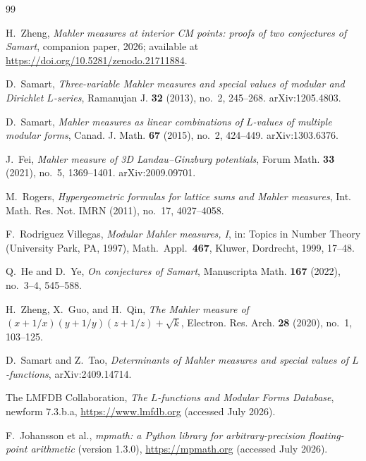 \documentclass[11pt]{article}
\theoremstyle{definition}
\theoremstyle{remark}
\begin{document}
\begin{thebibliography}{99}

H.~Zheng,
\emph{Mahler measures at interior CM points: proofs of two conjectures
of Samart},
companion paper, 2026; available at
\url{https://doi.org/10.5281/zenodo.21711884}.

D.~Samart,
\emph{Three-variable Mahler measures and special values of modular and
Dirichlet $L$-series},
Ramanujan J. \textbf{32} (2013), no.~2, 245--268.
arXiv:1205.4803.

D.~Samart,
\emph{Mahler measures as linear combinations of $L$-values of multiple
modular forms},
Canad. J. Math. \textbf{67} (2015), no.~2, 424--449.
arXiv:1303.6376.

J.~Fei,
\emph{Mahler measure of 3D Landau--Ginzburg potentials},
Forum Math. \textbf{33} (2021), no.~5, 1369--1401.
arXiv:2009.09701.

M.~Rogers,
\emph{Hypergeometric formulas for lattice sums and Mahler measures},
Int. Math. Res. Not. IMRN (2011), no.~17, 4027--4058.

F.~Rodriguez Villegas,
\emph{Modular Mahler measures, I},
in: Topics in Number Theory (University Park, PA, 1997),
Math.\ Appl.\ \textbf{467}, Kluwer, Dordrecht, 1999, 17--48.

Q.~He and D.~Ye,
\emph{On conjectures of Samart},
Manuscripta Math. \textbf{167} (2022), no.~3--4, 545--588.

H.~Zheng, X.~Guo, and H.~Qin,
\emph{The Mahler measure of $(x+1/x)(y+1/y)(z+1/z)+\sqrt{k}$},
Electron. Res. Arch. \textbf{28} (2020), no.~1, 103--125.

D.~Samart and Z.~Tao,
\emph{Determinants of Mahler measures and special values of
$L$-functions},
arXiv:2409.14714.

The LMFDB Collaboration,
\emph{The $L$-functions and Modular Forms Database},
newform \textsf{7.3.b.a}, \url{https://www.lmfdb.org}
(accessed July 2026).

F.~Johansson et al.,
\emph{mpmath: a Python library for arbitrary-precision floating-point
arithmetic} (version 1.3.0), \url{https://mpmath.org}
(accessed July 2026).

\end{thebibliography}
\end{document}
